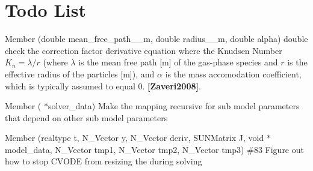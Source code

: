 \chapter{Todo List}
\hypertarget{todo}{}\label{todo}

\begin{DoxyRefList}
\item[Member \doxylink{util_8h_af0918da54a73bf30e7079908caea2efd}{d\+\_\+transition\+\_\+regime\+\_\+correction\+\_\+factor\+\_\+d\+\_\+radius} (double mean\+\_\+free\+\_\+path\+\_\+\+\_\+m, double radius\+\_\+\+\_\+m, double alpha)]\label{todo__todo000003}%
%
double check the correction factor derivative equation where the Knudsen Number $K_n = \lambda / r$ (where $\lambda$ is the mean free path \mbox{[}m\mbox{]} of the gas-\/phase species and $r$ is the effective radius of the particles \mbox{[}m\mbox{]}), and $ \alpha $ is the mass accomodation coefficient, which is typically assumed to equal 0. {\bfseries [Zaveri2008]}. 
\item[Member \doxylink{camp__solver_8h_a5b485fa25356197023889f3795888e98}{get\+\_\+jac\+\_\+init} (\doxylink{struct_solver_data}{Solver\+Data} \texorpdfstring{$\ast$}{*}solver\+\_\+data)]\label{todo__todo000002}%
%
Make the  mapping recursive for sub model parameters that depend on other sub model parameters  
\item[Member \doxylink{camp__solver_8h_a78e694c3221a39e0b96a5f40fa0fc0dd}{Jac} (realtype t, N\+\_\+\+Vector y, N\+\_\+\+Vector deriv, SUNMatrix J, void \texorpdfstring{$\ast$}{*}model\+\_\+data, N\+\_\+\+Vector tmp1, N\+\_\+\+Vector tmp2, N\+\_\+\+Vector tmp3)]\label{todo__todo000001}%
%
\#83 Figure out how to stop CVODE from resizing the  during solving 
\end{DoxyRefList}